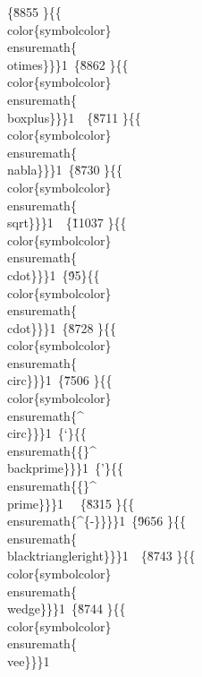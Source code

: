 {\{\u8855 \}\{\{\\color\{symbolcolor\}\\ensuremath\{\\otimes\}\}\}1\
\{\u8862 \}\{\{\\color\{symbolcolor\}\\ensuremath\{\\boxplus\}\}\}1\
\
\{\u8711 \}\{\{\\color\{symbolcolor\}\\ensuremath\{\\nabla\}\}\}1\
\{\u8730 \}\{\{\\color\{symbolcolor\}\\ensuremath\{\\sqrt\}\}\}1\
\
\{\u11037 \}\{\{\\color\{symbolcolor\}\\ensuremath\{\\cdot\}\}\}1\
\{\'95\}\{\{\\color\{symbolcolor\}\\ensuremath\{\\cdot\}\}\}1\
\{\u8728 \}\{\{\\color\{symbolcolor\}\\ensuremath\{\\circ\}\}\}1\
\{\u7506 \}\{\{\\color\{symbolcolor\}\\ensuremath\{^\\circ\}\}\}1\
\{`\}\{\{\\ensuremath\{\{\}^\\backprime\}\}\}1\
\{'\}\{\{\\ensuremath\{\{\}^\\prime\}\}\}1\
\
\{\u8315 \}\{\{\\ensuremath\{^\{-\}\}\}\}1\
\{\uc0\u9656 \}\{\{\\ensuremath\{\\blacktriangleright\}\}\}1\
\
\{\uc0\u8743 \}\{\{\\color\{symbolcolor\}\\ensuremath\{\\wedge\}\}\}1\
\{\uc0\u8744 \}\{\{\\color\{symbolcolor\}\\ensuremath\{\\vee\}\}\}1\
}
